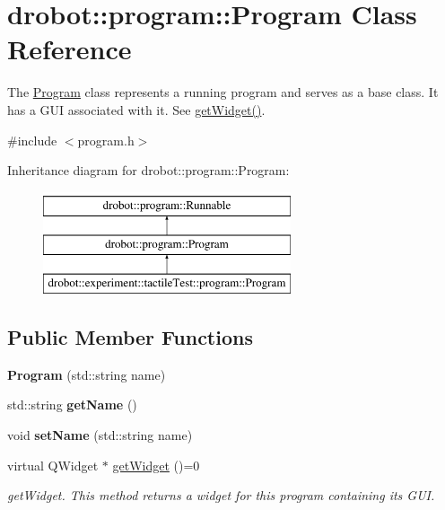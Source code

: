 \hypertarget{classdrobot_1_1program_1_1Program}{\section{drobot\-:\-:program\-:\-:Program Class Reference}
\label{classdrobot_1_1program_1_1Program}
}


The \hyperlink{classdrobot_1_1program_1_1Program}{Program} class represents a running program and serves as a base class. It has a G\-U\-I associated with it. See \hyperlink{classdrobot_1_1program_1_1Program_a488b539642af7dbc51a2a8562a5fb33b}{get\-Widget()}.  




{\ttfamily \#include $<$program.\-h$>$}

Inheritance diagram for drobot\-:\-:program\-:\-:Program\-:\begin{figure}[H]
\begin{center}
\leavevmode
\includegraphics[height=3.000000cm]{classdrobot_1_1program_1_1Program}
\end{center}
\end{figure}
\subsection*{Public Member Functions}
\begin{DoxyCompactItemize}
\item 
\hypertarget{classdrobot_1_1program_1_1Program_ad9c4cb13794de0e6c5f90e155d5e6e57}{{\bfseries Program} (std\-::string name)}\label{classdrobot_1_1program_1_1Program_ad9c4cb13794de0e6c5f90e155d5e6e57}

\item 
\hypertarget{classdrobot_1_1program_1_1Program_a7aec4494957e88d290c33de27d1fa623}{std\-::string {\bfseries get\-Name} ()}\label{classdrobot_1_1program_1_1Program_a7aec4494957e88d290c33de27d1fa623}

\item 
\hypertarget{classdrobot_1_1program_1_1Program_ab69fd00918f24938a6289bf170c65c63}{void {\bfseries set\-Name} (std\-::string name)}\label{classdrobot_1_1program_1_1Program_ab69fd00918f24938a6289bf170c65c63}

\item 
virtual Q\-Widget $\ast$ \hyperlink{classdrobot_1_1program_1_1Program_a488b539642af7dbc51a2a8562a5fb33b}{get\-Widget} ()=0
\begin{DoxyCompactList}\small\item\em get\-Widget. This method returns a widget for this program containing its G\-U\-I. \end{DoxyCompactList}\end{DoxyCompactItemize}
